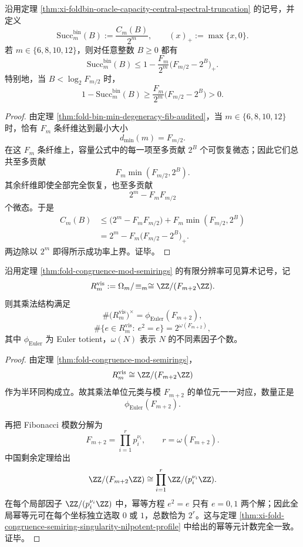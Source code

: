 \begin{theorem}[审计偶数窗上最小退化扇区强制预言机成功率硬上界]\label{thm:xi-foldbin-audited-window-oracle-hard-cap}
沿用定理 \ref{thm:xi-foldbin-oracle-capacity-central-spectral-truncation} 的记号，并定义
\[
\mathrm{Succ}_m^{\mathrm{bin}}(B):=\frac{C_m(B)}{2^m},
\qquad
(x)_+:=\max\{x,0\}.
\]
若 \(m\in\{6,8,10,12\}\)，则对任意整数 \(B\ge 0\) 都有
\[
\boxed{\;
\mathrm{Succ}_m^{\mathrm{bin}}(B)
\le
1-\frac{F_m}{2^m}\bigl(F_{m/2}-2^B\bigr)_+.\;}
\]
特别地，当 \(B<\log_2 F_{m/2}\) 时，
\[
1-\mathrm{Succ}_m^{\mathrm{bin}}(B)
\ge
\frac{F_m}{2^m}\bigl(F_{m/2}-2^B\bigr)
>
0.
\]
\end{theorem}
\begin{proof}
由定理 \ref{thm:fold-bin-min-degeneracy-fib-audited}，当 \(m\in\{6,8,10,12\}\) 时，恰有 \(F_m\) 条纤维达到最小大小
\[
d_{\min}(m)=F_{m/2}.
\]
在这 \(F_m\) 条纤维上，容量公式中的每一项至多贡献 \(2^B\) 个可恢复微态；因此它们总共至多贡献
\[
F_m\min(F_{m/2},2^B).
\]
其余纤维即使全部完全恢复，也至多贡献
\[
2^m-F_mF_{m/2}
\]
个微态。于是
\[
\begin{aligned}
C_m(B)
&\le
\bigl(2^m-F_mF_{m/2}\bigr)+F_m\min(F_{m/2},2^B)\\
&=
2^m-F_m\bigl(F_{m/2}-2^B\bigr)_+.
\end{aligned}
\]
两边除以 \(2^m\) 即得所示成功率上界。证毕。
\end{proof}

\begin{theorem}[有限分辨率可见算术的单位元与幂等元计数闭式]\label{thm:xi-visible-arithmetic-unit-idempotent-count}
沿用定理 \ref{thm:fold-congruence-mod-semirings} 的有限分辨率可见算术记号，记
\[
R_m^{\mathrm{vis}}:=\Omega_m/\!\equiv_m
\cong
\ZZ/(F_{m+2}\ZZ).
\]
则其乘法结构满足
\[
\boxed{\;
\#\bigl(R_m^{\mathrm{vis}}\bigr)^\times
=
\phi_{\mathrm{Euler}}(F_{m+2}),\;}
\]
\[
\boxed{\;
\#\{e\in R_m^{\mathrm{vis}}:\ e^2=e\}
=
2^{\omega(F_{m+2})},\;}
\]
其中 \(\phi_{\mathrm{Euler}}\) 为 Euler totient，\(\omega(N)\) 表示 \(N\) 的不同素因子个数。
\end{theorem}
\begin{proof}
由定理 \ref{thm:fold-congruence-mod-semirings}，
\[
R_m^{\mathrm{vis}}\cong \ZZ/(F_{m+2}\ZZ)
\]
作为半环同构成立。故其乘法单位元类与模 \(F_{m+2}\) 的单位元一一对应，数量正是
\[
\phi_{\mathrm{Euler}}(F_{m+2}).
\]

再把 Fibonacci 模数分解为
\[
F_{m+2}=\prod_{i=1}^{r}p_i^{\nu_i},
\qquad
r=\omega(F_{m+2}).
\]
中国剩余定理给出
\[
\ZZ/(F_{m+2}\ZZ)\cong \prod_{i=1}^{r}\ZZ/(p_i^{\nu_i}\ZZ).
\]
在每个局部因子 \(\ZZ/(p_i^{\nu_i}\ZZ)\) 中，幂等方程 \(e^2=e\) 只有 \(e=0,1\) 两个解；因此全局幂等元可在每个坐标独立选取 \(0\) 或 \(1\)，总数恰为 \(2^r\)。这与定理 \ref{thm:xi-fold-congruence-semiring-singularity-nilpotent-profile} 中给出的幂等元计数完全一致。证毕。
\end{proof}

